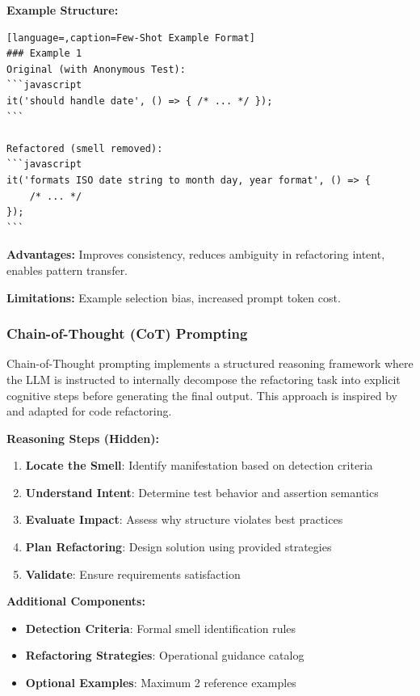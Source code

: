 \documentclass[12pt]{article}
\begin{document}
\textbf{Example Structure:}
\begin{lstlisting}[language=,caption=Few-Shot Example Format]
### Example 1
Original (with Anonymous Test):
```javascript
it('should handle date', () => { /* ... */ });
```

Refactored (smell removed):
```javascript
it('formats ISO date string to month day, year format', () => {
    /* ... */
});
```
\end{lstlisting}

\textbf{Advantages:} Improves consistency, reduces ambiguity in refactoring intent, enables pattern transfer.

\textbf{Limitations:} Example selection bias, increased prompt token cost.

\subsubsection{Chain-of-Thought (CoT) Prompting}

Chain-of-Thought prompting implements a structured reasoning framework where the LLM is instructed to internally decompose the refactoring task into explicit cognitive steps before generating the final output. This approach is inspired by \cite{wei2022chain} and adapted for code refactoring.

\textbf{Reasoning Steps (Hidden):}
\begin{enumerate}
    \item \textbf{Locate the Smell}: Identify manifestation based on detection criteria
    \item \textbf{Understand Intent}: Determine test behavior and assertion semantics
    \item \textbf{Evaluate Impact}: Assess why structure violates best practices
    \item \textbf{Plan Refactoring}: Design solution using provided strategies
    \item \textbf{Validate}: Ensure requirements satisfaction
\end{enumerate}

\textbf{Additional Components:}
\begin{itemize}
    \item \textbf{Detection Criteria}: Formal smell identification rules
    \item \textbf{Refactoring Strategies}: Operational guidance catalog
    \item \textbf{Optional Examples}: Maximum 2 reference examples
\end{itemize}
\end{document}
